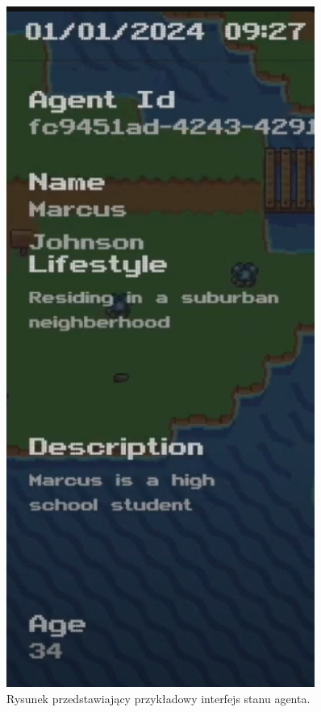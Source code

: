 \begin{figure}[htbp]
    \centering
    \includegraphics[width=0.9\textwidth, height=0.6\textheight]{images/411state.png}
    \caption{Rysunek przedstawiający przykładowy interfejs stanu agenta.}
    \label{fig:stateagent}
\end{figure}
